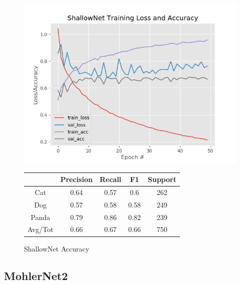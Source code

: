 \documentclass[12pt]{article}
\begin{document}
\begin{figure}[h]
	\centering %
	\captionsetup{justification=centering}
	\begin{minipage}{0.5\textwidth}
		\centering %
		\includegraphics[width=1\textwidth]{BaselineResults_ShallowNet_opt-SGD.png}
		\caption{ShallowNet Accuracy} \label{SN}
	\end{minipage}\hfill
	\begin{minipage}{0.5\textwidth}
		\begin{center}
			\begin{tabular}[2pt]{| c| c| c| c|c|}
				\hline
				& Precision & Recall & F1 & Support \\[0.5ex] 
				\hline 	
				Cat   &    0.64	&0.57&	0.6&	262\\ \hline 
				Dog    &   0.57&	0.58&	0.58&	249\\ \hline 
				Panda   &   0.79&	0.86&	0.82&	239	\\ \hline 
				Avg/Tot  &     0.66 &	0.67 &	0.66 &	750\\ \hline 
				
			\end{tabular}
			\label{SNR}
		\end{center}	
	\end{minipage}
\end{figure}
\newpage
\subsection{MohlerNet2}
\end{document}
